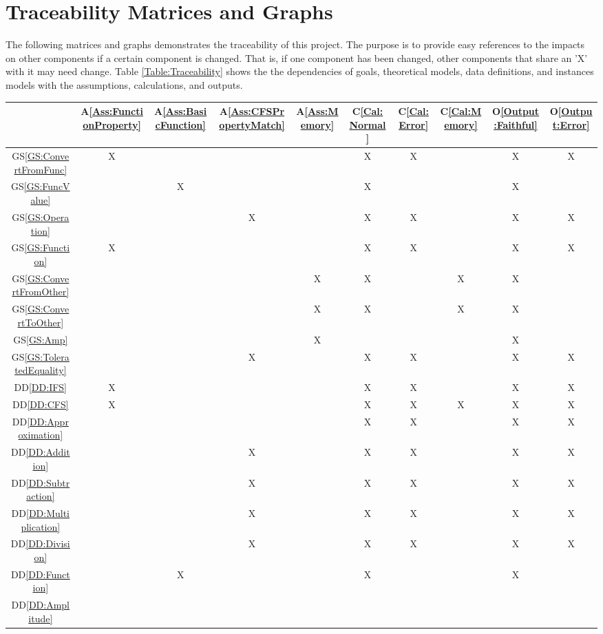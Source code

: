 \documentclass[12pt]{article}
\newcommand{\ddref}[1]{DD\ref{#1}}
\newcommand{\aref}[1]{A\ref{#1}}
\newcommand{\calref}[1]{C\ref{#1}}
\newcommand{\oref}[1]{O\ref{#1}}
\newcommand{\gsref}[1]{GS\ref{#1}}
\begin{document}
\section{Traceability Matrices and Graphs}\label{Sc:Trace}
The following matrices and graphs demonstrates the traceability of this project. The purpose is to provide easy references to the impacts on other components if a certain component is changed. That is, if one component has been changed, other components that share an 'X' with it may need change. Table \ref{Table:Traceability} shows the the dependencies of goals, theoretical models, data definitions, and instances models with the assumptions, calculations, and outputs.
\begin{table}
	\centering
	\begin{tabular}{|c|c|c|c|c|c|c|c|c|c|}
		\hline
		&\aref{Ass:FunctionProperty}&\aref{Ass:BasicFunction}&\aref{Ass:CFSPropertyMatch}&\aref{Ass:Memory}&\calref{Cal:Normal}&\calref{Cal:Error}&\calref{Cal:Memory}&\oref{Output:Faithful}&\oref{Output:Error}\\
		\hline
		\gsref{GS:ConvertFromFunc}
		&X& & & &X&X&  &X&X\\\hline
		\gsref{GS:FuncValue}
		& &X& & &X& & &X& \\\hline
		\gsref{GS:Operation}
		& & &X& &X&X& &X&X \\\hline
		\gsref{GS:Function}
		&X& & & &X&X& &X&X\\\hline
		\gsref{GS:ConvertFromOther}
		& & & &X&X& &X&X& \\\hline
		\gsref{GS:ConvertToOther}
		& & & &X&X& &X&X& \\\hline
		\gsref{GS:Amp}
		& & & &X& & & &X& \\\hline
		\gsref{GS:ToleratedEquality}
		& & &X& &X&X& &X&X\\\hline
		\ddref{DD:IFS}
		&X& & & &X&X& &X&X\\\hline
		\ddref{DD:CFS}
		&X& & & &X&X&X&X&X\\\hline
		\ddref{DD:Approximation}
		& & & & &X&X& &X&X\\\hline
		\ddref{DD:Addition}
		& & &X& &X&X& &X&X\\\hline
		\ddref{DD:Subtraction}
		& & &X& &X&X& &X&X\\\hline
		\ddref{DD:Multiplication}
		& & &X& &X&X& &X&X\\\hline
		\ddref{DD:Division}
		& & &X& &X&X& &X&X\\\hline
		\ddref{DD:Function}
		& &X& & &X& & &X& \\\hline
		\ddref{DD:Amplitude}

\end{tabular}
\end{table}
\end{document}
